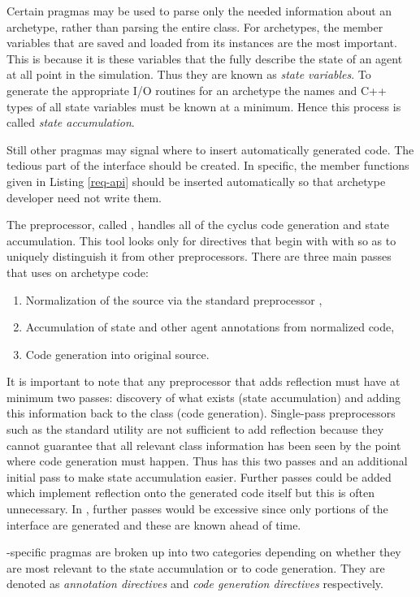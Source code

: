 Certain pragmas may be used to parse only the needed information 
about an archetype, rather than parsing the entire class. For archetypes, the 
member variables that are saved and loaded from its instances are the most important.
This is because it is these variables that the fully describe the state of an agent 
at all point in the simulation. Thus they are known as \emph{state variables}. 
To generate the appropriate I/O routines for an archetype the names and C++ types 
of all state variables must be known at a minimum. Hence this process is 
called \emph{state accumulation}. 

Still other pragmas may 
signal where to insert automatically generated code. The tedious 
part of the  interface should be created. In specific, 
the member functions given in Listing \ref{req-api} should be inserted automatically
so that archetype developer need not write them.

The \cyclus preprocessor, called \cycpp, handles all of the cyclus code generation
and state accumulation. This tool looks only for directives that begin with 
with  so as to uniquely distinguish it from other preprocessors.
There are three main passes that \cycpp uses on archetype code:
\begin{enumerate}
    \item Normalization of the source via the standard preprocessor , 
    \item Accumulation of state and other agent annotations from normalized code, 
    \item Code generation into original source.
\end{enumerate}
It is important to note that any preprocessor that adds reflection must have at
minimum two passes: discovery of what exists (state accumulation) and adding this
information back to the class (code generation). Single-pass preprocessors such 
as the standard  utility are not sufficient to add reflection because they 
cannot guarantee that all relevant class information has been seen by the point 
where code generation must happen. Thus \cycpp has this two passes and an additional 
initial pass to make state accumulation easier. Further passes could be added which 
implement reflection onto the generated code itself but this is often unnecessary. 
In \cyclus, further passes would be excessive since only portions of the 
 interface are generated and these are known ahead of time.

\cyclus-specific pragmas are broken up into two categories depending on whether 
they are most relevant to the state accumulation or to code generation. They 
are denoted as \emph{annotation directives} and \emph{code generation directives}
respectively.

